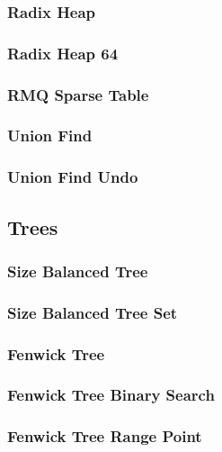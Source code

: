 \documentclass[8pt]{article}
\begin{document}
\subsubsection{Radix Heap}

\subsubsection{Radix Heap 64}

\subsubsection{RMQ Sparse Table}

\subsubsection{Union Find}

\subsubsection{Union Find Undo}


\subsection{Trees}
\subsubsection{Size Balanced Tree}

\subsubsection{Size Balanced Tree Set}

\subsubsection{Fenwick Tree}

\subsubsection{Fenwick Tree Binary Search}

\subsubsection{Fenwick Tree Range Point}

\end{document}

